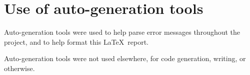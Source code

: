 \documentclass[11pt,a4paper]{article}
\begin{document}


\appendix
\section{Use of auto-generation tools}
Auto-generation tools were used to help parse error messages throughout the project, and to help format this \LaTeX\ report.

Auto-generation tools were not used elsewhere, for code generation, writing, or otherwise.
\end{document}
